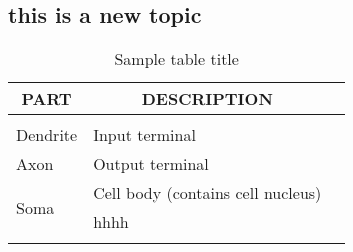 \documentclass{article}
\begin{document}
\subsection{this is a new topic}
\begin{table}[t]
\caption{Sample table title}
\label{sample-table}
\begin{center}
\begin{tabular}{lll}
\multicolumn{1}{c}{\bf PART}  &\multicolumn{1}{c}{\bf DESCRIPTION}
\\ \hline \\
Dendrite         &Input terminal \\
Axon             &Output terminal \\
\multirow{2}{*}{Soma}             &Cell body (contains cell nucleus) \\
                                &hhhh                              \\
\hline \\
\end{tabular}
\end{center}
\end{table}
\end{document}
